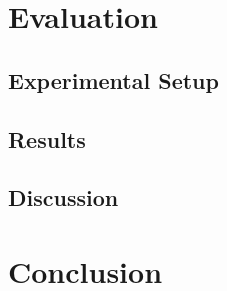 \section{Evaluation}

\subsection{Experimental Setup}

\lipsum[7]

\subsection{Results}

\lipsum[8]

\subsection{Discussion}

\lipsum[9]


\section{Conclusion}

\lipsum[10]

